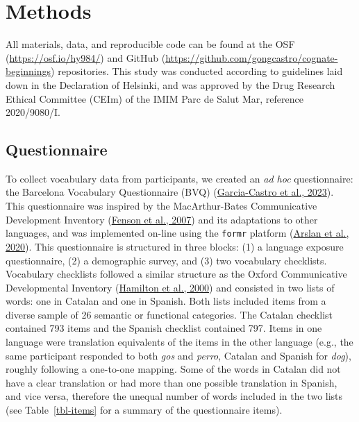 \documentclass[
]{article}
\begin{document}
\hypertarget{sec-methods}{%
\section{Methods}\label{sec-methods}}

All materials, data, and reproducible code can be found at the OSF
(\url{https://osf.io/hy984/}) and GitHub
(\url{https://github.com/gongcastro/cognate-beginnings}) repositories.
This study was conducted according to guidelines laid down in the
Declaration of Helsinki, and was approved by the Drug Research Ethical
Committee (CEIm) of the IMIM Parc de Salut Mar, reference 2020/9080/I.

\hypertarget{sec-questionnaire}{%
\subsection{Questionnaire}\label{sec-questionnaire}}

To collect vocabulary data from participants, we created an \emph{ad
hoc} questionnaire: the Barcelona Vocabulary Questionnaire (BVQ)
(\protect\hyperlink{ref-garcia-castro2023bvq}{Garcia-Castro et al.,
2023}). This questionnaire was inspired by the MacArthur-Bates
Communicative Development Inventory
(\protect\hyperlink{ref-fenson2007macarthurbates}{Fenson et al., 2007})
and its adaptations to other languages, and was implemented on-line
using the \texttt{formr} platform
(\protect\hyperlink{ref-arslan2020formr}{Arslan et al., 2020}). This
questionnaire is structured in three blocks: (1) a language exposure
questionnaire, (2) a demographic survey, and (3) two vocabulary
checklists. Vocabulary checklists followed a similar structure as the
Oxford Communicative Developmental Inventory
(\protect\hyperlink{ref-hamilton2000infant}{Hamilton et al., 2000}) and
consisted in two lists of words: one in Catalan and one in Spanish. Both
lists included items from a diverse sample of 26 semantic or functional
categories. The Catalan checklist contained 793 items and the Spanish
checklist contained 797. Items in one language were translation
equivalents of the items in the other language (e.g., the same
participant responded to both \emph{gos} and \emph{perro}, Catalan and
Spanish for \emph{dog}), roughly following a one-to-one mapping. Some of
the words in Catalan did not have a clear translation or had more than
one possible translation in Spanish, and vice versa, therefore the
unequal number of words included in the two lists (see
Table~\ref{tbl-items} for a summary of the questionnaire items).
\end{document}
